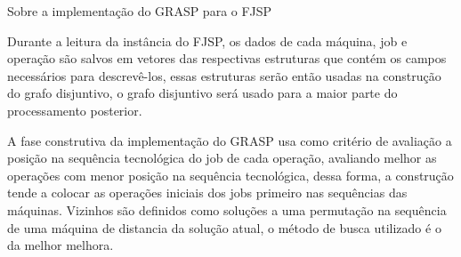 		

		Sobre a implementação do GRASP para o FJSP		

	
        Durante a leitura da instância do FJSP, os dados de cada máquina, job e operação são salvos em vetores das respectivas estruturas que contém os campos necessários para descrevê-los, essas estruturas serão então usadas na construção do grafo disjuntivo, o grafo disjuntivo será usado para a maior parte do processamento posterior. 
    
        A fase construtiva da implementação do GRASP usa como critério de avaliação a posição na sequência tecnológica do job de cada operação, avaliando melhor as operações com menor posição na sequência tecnológica, dessa forma, a construção tende a colocar as operações iniciais dos jobs primeiro nas sequências das máquinas. Vizinhos são definidos como soluções a uma permutação na sequência de uma máquina de distancia da solução atual, o método de busca utilizado é o da melhor melhora.